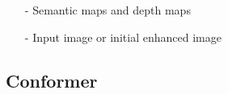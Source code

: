 \documentclass[CJK,aspectratio=169]{beamer}  %
\begin{document}
\begin{frame}
\begin{minipage}{.45\textwidth}
\begin{itemize}
			\item [-] Semantic maps and depth maps
			
			\item [-] Input image or initial enhanced image
			
			\end{itemize}
		\end{minipage}
	\end{frame}
	
	\subsection{Conformer}
	
\end{document}
